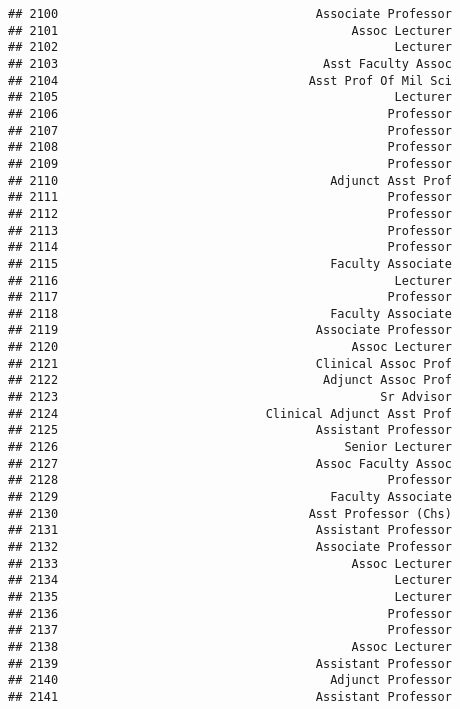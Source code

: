 \documentclass[
]{article}
\begin{document}
\begin{verbatim}
## 2100                                    Associate Professor
## 2101                                         Assoc Lecturer
## 2102                                               Lecturer
## 2103                                     Asst Faculty Assoc
## 2104                                   Asst Prof Of Mil Sci
## 2105                                               Lecturer
## 2106                                              Professor
## 2107                                              Professor
## 2108                                              Professor
## 2109                                              Professor
## 2110                                      Adjunct Asst Prof
## 2111                                              Professor
## 2112                                              Professor
## 2113                                              Professor
## 2114                                              Professor
## 2115                                      Faculty Associate
## 2116                                               Lecturer
## 2117                                              Professor
## 2118                                      Faculty Associate
## 2119                                    Associate Professor
## 2120                                         Assoc Lecturer
## 2121                                    Clinical Assoc Prof
## 2122                                     Adjunct Assoc Prof
## 2123                                             Sr Advisor
## 2124                             Clinical Adjunct Asst Prof
## 2125                                    Assistant Professor
## 2126                                        Senior Lecturer
## 2127                                    Assoc Faculty Assoc
## 2128                                              Professor
## 2129                                      Faculty Associate
## 2130                                   Asst Professor (Chs)
## 2131                                    Assistant Professor
## 2132                                    Associate Professor
## 2133                                         Assoc Lecturer
## 2134                                               Lecturer
## 2135                                               Lecturer
## 2136                                              Professor
## 2137                                              Professor
## 2138                                         Assoc Lecturer
## 2139                                    Assistant Professor
## 2140                                      Adjunct Professor
## 2141                                    Assistant Professor

\end{verbatim}
\end{document}
